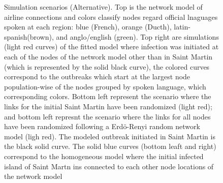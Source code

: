 \documentclass[11pt]{article}
\begin{document}
\begin{figure}[ht]
\caption{\small Simulation scenarios (Alternative). Top is the network model of airline connections and colors classify nodes regard official lnaguages spoken at each region: blue (French), orange (Ducth), latin-spanish(brown), and anglo/english (green). Top right are simulations (light red curves) of the fitted model where infection was initiated at each of the nodes of the network model other than in Saint Martin (which is represented by the solid black curve), the colored curves correspond to the outbreaks which start at the largest node population-wise of the nodes grouped by spoken language, which corresponding colors. Bottom left represent the scenario where the links for the initial Saint Martin have been randomized (light red); and bottom left represnt the scenario where the links for all nodes have been randomized following a Erd\"{o}-Renyi random network model (ligh red). The modeled outbreak initiated in Saint Martin is the black solid curve. The solid blue curves (bottom leaft and right) correspond to the homogeneous model where the initial infected island of Saint Martn ins connected to each other node locations of the network model}
\label{fig:scenarios-alt}
\end{figure}
%
\vspace{2cm}
%
\end{document}
